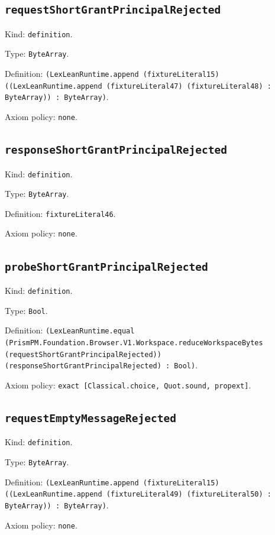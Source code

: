 \documentclass[11pt]{article}
\begin{document}
\subsection*{\texttt{requestShortGrantPrincipalRejected}}
\noindent Kind: \texttt{definition}.\par
\noindent Type: \texttt{ByteArray}.\par
\noindent Definition: \texttt{(LexLeanRuntime.append (fixtureLiteral15) ((LexLeanRuntime.append (fixtureLiteral47) (fixtureLiteral48) : ByteArray)) : ByteArray)}.\par
\noindent Axiom policy: \texttt{none}.\par
\subsection*{\texttt{responseShortGrantPrincipalRejected}}
\noindent Kind: \texttt{definition}.\par
\noindent Type: \texttt{ByteArray}.\par
\noindent Definition: \texttt{fixtureLiteral46}.\par
\noindent Axiom policy: \texttt{none}.\par
\subsection*{\texttt{probeShortGrantPrincipalRejected}}
\noindent Kind: \texttt{definition}.\par
\noindent Type: \texttt{Bool}.\par
\noindent Definition: \texttt{(LexLeanRuntime.equal (PrismPM.Foundation.Browser.V1.Workspace.reduceWorkspaceBytes (requestShortGrantPrincipalRejected)) (responseShortGrantPrincipalRejected) : Bool)}.\par
\noindent Axiom policy: \texttt{exact [Classical.choice, Quot.sound, propext]}.\par
\subsection*{\texttt{requestEmptyMessageRejected}}
\noindent Kind: \texttt{definition}.\par
\noindent Type: \texttt{ByteArray}.\par
\noindent Definition: \texttt{(LexLeanRuntime.append (fixtureLiteral15) ((LexLeanRuntime.append (fixtureLiteral49) (fixtureLiteral50) : ByteArray)) : ByteArray)}.\par
\noindent Axiom policy: \texttt{none}.\par
\end{document}

